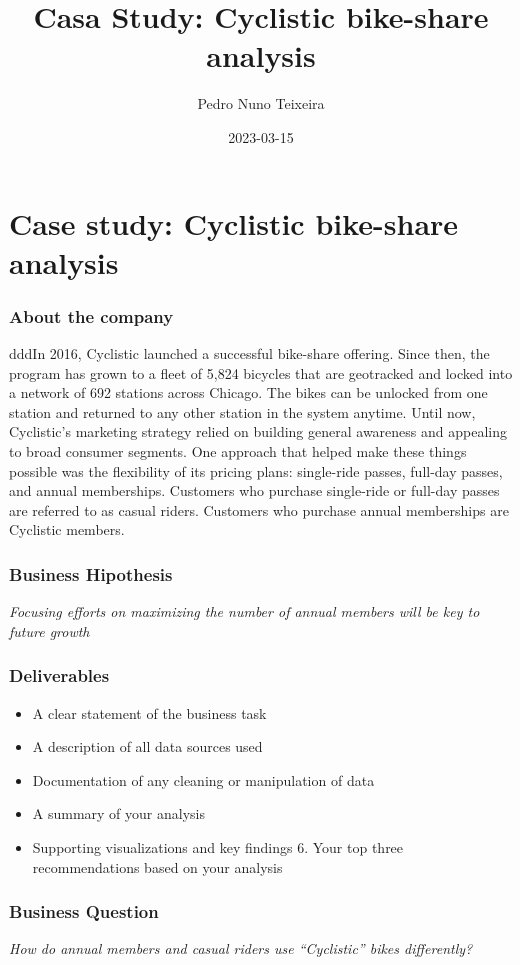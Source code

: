 \documentclass[
]{article}
\title{Casa Study: Cyclistic bike-share analysis}
\author{Pedro Nuno Teixeira}
\date{2023-03-15}
\begin{document}
\maketitle

\hypertarget{case-study-cyclistic-bike-share-analysis}{%
\section{Case study: Cyclistic bike-share
analysis}\label{case-study-cyclistic-bike-share-analysis}}

\hypertarget{about-the-company}{%
\subsubsection{About the company}\label{about-the-company}}

dddIn 2016, Cyclistic launched a successful bike-share offering. Since
then, the program has grown to a fleet of 5,824 bicycles that are
geotracked and locked into a network of 692 stations across Chicago. The
bikes can be unlocked from one station and returned to any other station
in the system anytime. Until now, Cyclistic's marketing strategy relied
on building general awareness and appealing to broad consumer segments.
One approach that helped make these things possible was the flexibility
of its pricing plans: single-ride passes, full-day passes, and annual
memberships. Customers who purchase single-ride or full-day passes are
referred to as casual riders. Customers who purchase annual memberships
are Cyclistic members.

\hypertarget{business-hipothesis}{%
\subsubsection{Business Hipothesis}\label{business-hipothesis}}

\emph{Focusing efforts on maximizing the number of annual members will
be key to future growth}

\hypertarget{deliverables}{%
\subsubsection{Deliverables}\label{deliverables}}

\begin{itemize}
\item
  A clear statement of the business task
\item
  A description of all data sources used
\item
  Documentation of any cleaning or manipulation of data
\item
  A summary of your analysis
\item
  Supporting visualizations and key findings 6. Your top three
  recommendations based on your analysis
\end{itemize}

\hypertarget{business-question}{%
\subsubsection{Business Question}\label{business-question}}

\emph{How do annual members and casual riders use ``Cyclistic'' bikes
differently?}
\end{document}
